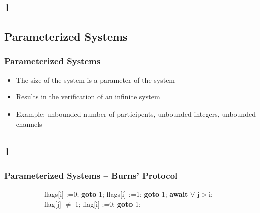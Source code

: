 \documentclass[handout]{beamer}
\begin{document}
\subsection*{1}
\subsection{Parameterized Systems}
\begin{frame}
  \frametitle{Parameterized Systems}
  \begin{itemize}
  \item
    The size of the system is a parameter of the system
  \item
    Results in the verification of an infinite system %
  \item
    Example: unbounded number of participents, unbounded integers, unbounded channels
  \end{itemize}
\end{frame}

\subsection*{1}
\begin{frame}
  \frametitle{Parameterized Systems -- Burns' Protocol}
  \begin{figure}
    \begin{example}
      \begin{subfigure}[b]{0.49\textwidth}
        \begin{algorithmic}
          \footnotesize
          \State flags[i] :=0;
           \State \textbf{goto} 1;
          \EndIf
          \State flags[i] :=1;
           \State \textbf{goto} 1;
          \EndIf
          \State \textbf{await} $\forall$ j$>$i: flag[j] $\neq$ 1;
          \State flag[i] :=0; \textbf{goto} 1;
        \end{algorithmic}
      \end{subfigure}
      \begin{subfigure}[b]{0.49\textwidth}
        \burns
      \end{subfigure}
    \end{example}
  \end{figure}
\end{frame}
\end{document}

